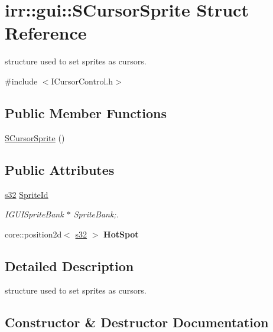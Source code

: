 \hypertarget{structirr_1_1gui_1_1SCursorSprite}{}\section{irr\+:\+:gui\+:\+:S\+Cursor\+Sprite Struct Reference}
\label{structirr_1_1gui_1_1SCursorSprite}


structure used to set sprites as cursors.  




{\ttfamily \#include $<$I\+Cursor\+Control.\+h$>$}

\subsection*{Public Member Functions}
\begin{DoxyCompactItemize}
\item 
\hyperlink{structirr_1_1gui_1_1SCursorSprite_a284c6acfbf07a4d8fea322a2352b8359}{S\+Cursor\+Sprite} ()
\end{DoxyCompactItemize}
\subsection*{Public Attributes}
\begin{DoxyCompactItemize}
\item 
\hyperlink{namespaceirr_ac66849b7a6ed16e30ebede579f9b47c6}{s32} \hyperlink{structirr_1_1gui_1_1SCursorSprite_a2cd96bcba94acfed5e5d5bddbf61c649}{Sprite\+Id}
\begin{DoxyCompactList}\small\item\em I\+G\+U\+I\+Sprite\+Bank $\ast$ Sprite\+Bank;. \end{DoxyCompactList}\item 
core\+::position2d$<$ \hyperlink{namespaceirr_ac66849b7a6ed16e30ebede579f9b47c6}{s32} $>$ {\bfseries Hot\+Spot}\hypertarget{structirr_1_1gui_1_1SCursorSprite_af6c0e6670092e2d608aa0e051db43401}{}\label{structirr_1_1gui_1_1SCursorSprite_af6c0e6670092e2d608aa0e051db43401}

\end{DoxyCompactItemize}


\subsection{Detailed Description}
structure used to set sprites as cursors. 

\subsection{Constructor \& Destructor Documentation}
